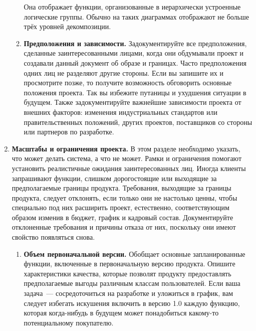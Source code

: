 \documentclass{../../text-style}
\begin{document}
\begin{enumerate}
\begin{enumerate}
        Она отображает функции, организованные в иерархически устроенные логические группы. Обычно на таких диаграммах отображают не больше трёх уровней декомпозиции.
        \item \textbf{Предположения и зависимости.} Задокументируйте все предположения, сделанные заинтересованными лицами, когда они обдумывали проект и создавали данный документ об образе и границах. Часто предположения одних лиц не разделяют другие стороны. Если вы запишите их и просмотрите позже, то получите возможность обговорить основные положения проекта. Так вы избежите путаницы и ухудшения ситуации в будущем. Также задокументируйте важнейшие зависимости проекта от внешних факторов: изменения индустриальных стандартов или правительственных положений, других проектов, поставщиков со стороны или партнеров по разработке.
    \end{enumerate}
    \item \textbf{Масштабы и ограничения проекта.} В этом разделе необходимо указать, что может делать система, а что не может. Рамки и ограничения помогают установить реалистичные ожидания заинтересованных лиц. Иногда клиенты запрашивают функции, слишком дорогостоящие или выходящие за предполагаемые границы продукта. Требования, выходящие за границы продукта, следует отклонять, если только они не настолько ценны, чтобы специально под них расширить проект, естественно, соответствующим образом изменив в бюджет, график и кадровый состав. Документируйте отклоненные требования и причины отказа от них, поскольку они имеют свойство появляться снова.
    \begin{enumerate}
        \item \textbf{Объем первоначальной версии.} Обобщает основные запланированные функции, включенные в первоначальную версию продукта. Опишите характеристики качества, которые позволят продукту предоставлять предполагаемые выгоды различным классам пользователей. Если ваша задача~--- сосредоточиться на разработке и уложиться в график, вам следует избегать искушения включить в версию 1.0 каждую функцию, которая когда-нибудь в будущем может понадобиться какому-то потенциальному покупателю.


\end{enumerate}
\end{enumerate}
\end{document}
